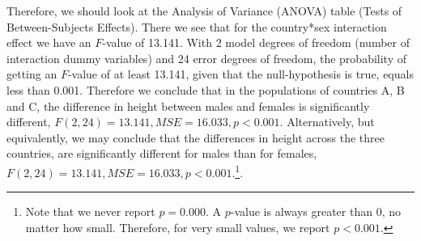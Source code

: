 \documentclass[]{book}\usepackage[]{graphicx}\usepackage[]{color}
\begin{document}
Therefore, we should look at the Analysis of Variance (ANOVA) table (Tests of Between-Subjects Effects). There we see that for the country*sex interaction effect we have an $F$-value of 13.141. With 2 model degrees of freedom (number of interaction dummy variables) and 24 error degrees of freedom, the probability of getting an $F$-value of at least 13.141, given that the null-hypothesis is true, equals less than 0.001. Therefore we conclude that in the populations of countries A, B and C, the difference in height between males and females is significantly different, $F(2, 24)=13.141, MSE=16.033, p < 0.001$. Alternatively, but equivalently, we may conclude that the differences in height across the three countries, are significantly different for males than for females, $F(2, 24)=13.141, MSE=16.033, p < 0.001$.\footnote{Note that we never report $p=0.000$. A $p$-value is always greater than 0, no matter how small. Therefore, for very small values, we report $p < 0.001$.}. 
\end{document}
